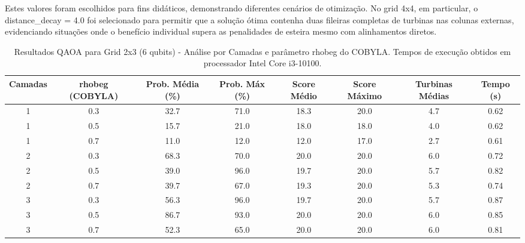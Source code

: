 \documentclass{weciq}
\begin{document}
Estes valores foram escolhidos para fins didáticos, demonstrando diferentes cenários de otimização. No grid 4x4, em particular, o distance\_decay = 4.0 foi selecionado para permitir que a solução ótima contenha duas fileiras completas de turbinas nas colunas externas, evidenciando situações onde o benefício individual supera as penalidades de esteira mesmo com alinhamentos diretos.

\begin{table}[htbp]
\centering
\caption{Resultados QAOA para Grid 2x3 (6 qubits) - Análise por Camadas e parâmetro rhobeg do COBYLA. Tempos de execução obtidos em processador Intel Core i3-10100.}
\label{tab:resultados_2_3}
\footnotesize
\begin{tabular}{|c|c|c|c|c|c|c|c|}
\hline
\textbf{Camadas} & \textbf{rhobeg (COBYLA)} & \textbf{Prob. Média (\%)} & \textbf{Prob. Máx (\%)} & \textbf{Score Médio} & \textbf{Score Máximo} & \textbf{Turbinas Médias} & \textbf{Tempo (s)} \\
\hline
1 & 0.3 & 32.7 & 71.0 & 18.3 & 20.0 & 4.7 & 0.62 \\
1 & 0.5 & 15.7 & 21.0 & 18.0 & 18.0 & 4.0 & 0.62 \\
1 & 0.7 & 11.0 & 12.0 & 12.0 & 17.0 & 2.7 & 0.61 \\
2 & 0.3 & 68.3 & 70.0 & 20.0 & 20.0 & 6.0 & 0.72 \\
2 & 0.5 & 39.0 & 96.0 & 19.7 & 20.0 & 5.7 & 0.82 \\
2 & 0.7 & 39.7 & 67.0 & 19.3 & 20.0 & 5.3 & 0.74 \\
3 & 0.3 & 56.3 & 96.0 & 19.7 & 20.0 & 5.7 & 0.87 \\
3 & 0.5 & 86.7 & 93.0 & 20.0 & 20.0 & 6.0 & 0.85 \\
3 & 0.7 & 52.3 & 65.0 & 20.0 & 20.0 & 6.0 & 0.81 \\
\hline
\end{tabular}
\end{table}
\end{document}
